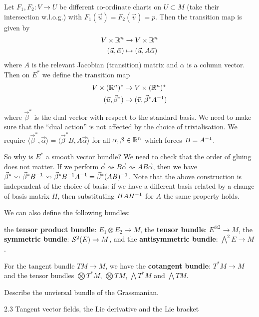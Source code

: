 Let $F_1, F_2: V \to U$ be different co-ordinate charts on $U \subset M$ (take their intersection w.l.o.g.) with $F_1(\vec u)=F_2(\vec v)=p$.
Then the transition map is given by
\begin{align*}
  V \times \mathbb{R}^n &\to V \times \mathbb{R}^n \\
  (\vec u, \vec \alpha) &\mapsto (\vec u, A \vec \alpha)
\end{align*}
where $A$ is the relevant Jacobian (transition) matrix and $\alpha$ is a column vector.
Then on $E^*$ we define the transition map
\begin{align*}
  V \times (\mathbb{R}^n)^* &\to V \times (\mathbb{R}^n)^* \\
  (\vec u, \vec \beta^*) &\mapsto (\vec v, \vec \beta^* A^{-1})
\end{align*}
where $\vec\beta^*$ is the dual vector with respect to the standard basis.
We need to make sure that the ``dual action'' is not affected by the choice of trivialisation.
We require $\langle\vec\beta^*,\vec\alpha\rangle = \langle\vec\beta^*B,A\vec\alpha\rangle$ for all $\alpha,\beta\in\mathbb{R}^n$ which forces $B=A^{-1}$.

So why is $E^*$ a smooth vector bundle?
We need to check that the order of gluing does not matter.
If we perform $\vec\alpha \rightsquigarrow B\vec\alpha \rightsquigarrow AB\vec\alpha$, then we have $\vec\beta^* \rightsquigarrow \vec\beta^* B^{-1} \rightsquigarrow \vec\beta^*B^{-1} A^{-1} = \vec\beta^* (AB)^{-1}$.
Note that the above construction is independent of the choice of basis: if we have a different basis related by a change of basis matrix $H$, then substituting $HAH^{-1}$ for $A$ the same property holds.

We can also define the following bundles:
\begin{itm}
  \io the \textbf{tensor product bundle}: $E_1 \otimes E_2 \to M$,
  \io the \textbf{tensor bundle}: $E^{\otimes 2} \to M$,
  \io the \textbf{symmetric bundle}: $\mathcal{S}^2(E) \to M$, and
  \io the \textbf{antisymmetric bundle}: $\bigwedge^2 E \to M$.
\end{itm}

For the tangent bundle $TM \to M$, we have the \textbf{cotangent bundle}: $T^*M \to M$ and the tensor bundles $\bigotimes T^*M$, $\bigotimes TM$, $\bigwedge T^*M$ and $\bigwedge TM$.

\begin{exer}
  Describe the unviersal bundle of the Grassmanian.
\end{exer}

2.3 Tangent vector fields, the Lie derivative and the Lie bracket

